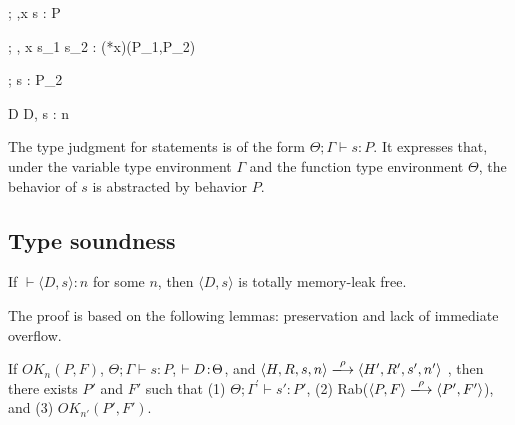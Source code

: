 \begin{minipage}{\textwidth}

{\Theta ; \Gamma,x \vdash \scon\Sirx s : \scon\Sirx P}


{\Theta ; \Gamma, x \vdash \IFNULL\Sirx \; \THEN s_{1}\; \ELSE s_{2} : (*x)(P_1,P_2)}


{\Theta ; \Gamma \vdash s : P_{2}}

        {\vdash D \COL \Theta}
{\vdash \langle D, s \rangle : n}

\end{minipage}

The type judgment for statements is of the form $\Theta ; \Gamma
\vdash s : P$.  It expresses that, under the variable type environment
\(\Gamma\) and the function type environment \(\Theta\), the behavior
of $s$ is abstracted by behavior $P$.

\subsection{Type soundness}
\begin{theorem}\label{thm1}
If $\vdash \langle D, s \rangle : n$ for some \(n\), then \(\langle D,
s \rangle\) is totally memory-leak free.
\end{theorem}

The proof is based on the following lemmas: preservation and lack of
immediate overflow.

\begin{lemma}[Preservation]
\label{lem:preservation}
If \( OK_{n}(P, F)\), \(\Theta; \Gamma \vdash s : P \), \(\vdash D \!:\!
\Theta\), and \( \langle H,R,s,n \rangle \xlongrightarrow{\rho} \langle
H',R',s', n' \rangle \) , then there exists \(P'\) and \(F'\) such that (1) \( \Theta;
\Gamma^{'} \vdash s' : P'\), (2) Rab(\(\langle P, F \rangle \xlongrightarrow{\rho} \langle P', F' \rangle\)), and (3)
\(OK_{n'}(P', F')\).
\end{lemma}


